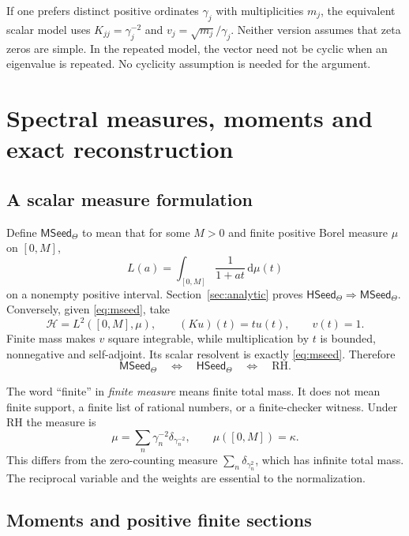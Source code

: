 \documentclass[11pt,a4paper]{article}
\numberwithin{equation}{section}
\theoremstyle{definition}
\theoremstyle{remark}
\newcommand{\HH}{\mathcal H}
\newcommand{\RH}{\mathrm{RH}}
\newcommand{\HSeed}{\mathsf{HSeed}_{\Theta}}
\newcommand{\MSeed}{\mathsf{MSeed}_{\Theta}}
\newcommand{\dd}{\,\mathrm d}
\begin{document}
If one prefers distinct positive ordinates $\gamma_j$ with multiplicities
$m_j$, the equivalent scalar model uses
$K_{jj}=\gamma_j^{-2}$ and $v_j=\sqrt{m_j}/\gamma_j$.
Neither version assumes that zeta zeros are simple. In the repeated
model, the vector need not be cyclic when an eigenvalue is repeated.
No cyclicity assumption is needed for the argument.

\section[Spectral measures and moments]{Spectral measures, moments and exact reconstruction}\label{sec:moments}

\subsection{A scalar measure formulation}

Define $\MSeed$ to mean that for some $M>0$ and finite positive
Borel measure $\mu$ on $[0,M]$,
\begin{equation}\label{eq:mseed}
L(a)=\int_{[0,M]}\frac1{1+at}\dd\mu(t)
\end{equation}
on a nonempty positive interval.
Section~\ref{sec:analytic} proves $\HSeed\Rightarrow\MSeed$.
Conversely, given \eqref{eq:mseed}, take
\[
\HH=L^2([0,M],\mu),\qquad(Ku)(t)=tu(t),\qquad v(t)=1.
\]
Finite mass makes $v$ square integrable, while multiplication by $t$
is bounded, nonnegative and self-adjoint. Its scalar resolvent is
exactly \eqref{eq:mseed}. Therefore
\begin{equation}\label{eq:measure-iff}
\MSeed\quad\Longleftrightarrow\quad\HSeed
\quad\Longleftrightarrow\quad\RH.
\end{equation}

The word ``finite'' in \emph{finite measure} means finite total mass.
It does not mean finite support, a finite list of rational numbers, or
a finite-checker witness. Under RH the measure is
\begin{equation}\label{eq:rh-measure}
\mu=\sum_n\gamma_n^{-2}\delta_{\gamma_n^{-2}},\qquad
\mu([0,M])=\kappa.
\end{equation}
This differs from the zero-counting measure
$\sum_n\delta_{\gamma_n^2}$, which has infinite total mass. The
reciprocal variable and the weights are essential to the normalization.

\subsection{Moments and positive finite sections}
\end{document}
